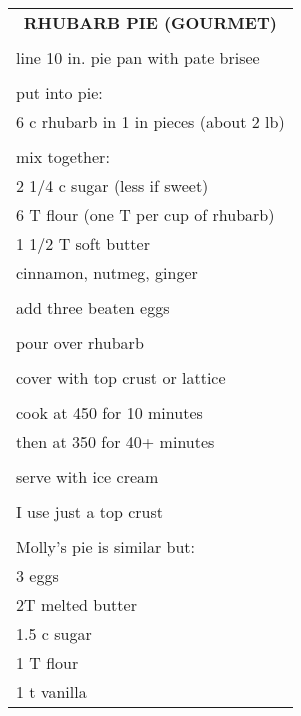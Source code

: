 \documentclass[8pt]{report}
\begin{document}
\newpage

\centering

\begin{tabular}{|l|} \hline	%
 
\multicolumn{1}{|c|}{\textbf{RHUBARB PIE (GOURMET)}}
\\
\\

\index{desserts!rhubarb pie (gourmet)} \index{rhubarb pie}
\index{pie!rhubarb}
line 10 in. pie pan with pate brisee\\
\\
put into pie:\\
\hspace{0.5 in} 6 c rhubarb in 1 in pieces (about 2 lb)\\
	\\
mix together:\\
\hspace{0.5 in}	2 1/4 c sugar (less if sweet)\\
\hspace{0.5 in}	6 T flour (one T per cup of rhubarb)\\
\hspace{0.5 in}	1 1/2 T soft butter\\
\hspace{0.5 in}	cinnamon, nutmeg, ginger\\
\\
add three beaten eggs\\
\\
pour over rhubarb\\
\\
cover with top crust or lattice\\
\\
cook at 450 for 10 minutes\\
then at 350 for 40+ minutes\\
\\
serve with ice cream\\
\\
I use just a top crust\\
\\
Molly's pie is similar but:\\
\hspace{0.5 in}	3 eggs\\
\hspace{0.5 in}	2T melted butter\\
\hspace{0.5 in}	1.5 c sugar\\
\hspace{0.5 in}	1 T flour\\
\hspace{0.5 in}	1 t vanilla\\



\hline

\end{tabular}
\end{document}
